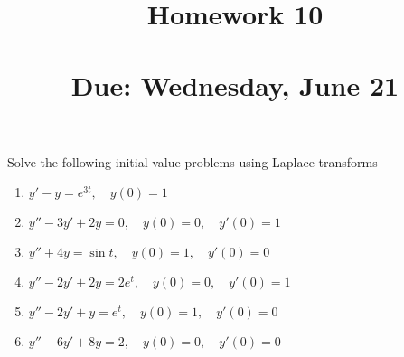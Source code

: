 


\title{Homework 10 \\ \hfill \\ Due: Wednesday, June 21}


\maketitle

\thispagestyle{fancy}






Solve the following initial value problems using Laplace transforms
\vspace{1em}


\begin{enumerate}
	\item $y' - y = e^{3t}, \quad y(0) = 1$
	\item $y'' - 3y' + 2y = 0, \quad y(0) = 0, \quad y'(0) = 1$
	\item $y'' + 4y = \sin t, \quad y(0) = 1, \quad y'(0) = 0$
	\item $y'' - 2y' + 2y = 2e^{t}, \quad y(0) = 0, \quad y'(0) = 1$
	\item $y'' - 2y' + y = e^{t}, \quad y(0) = 1, \quad y'(0) = 0$
	\item $y'' - 6y' + 8y = 2, \quad y(0) = 0, \quad y'(0) = 0$
\end{enumerate}





